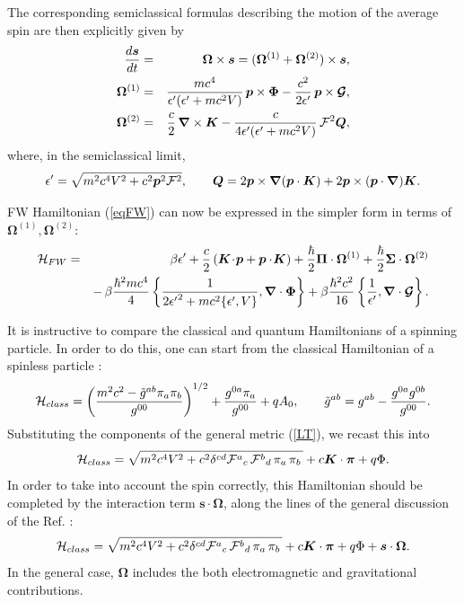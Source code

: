 \documentclass[preprint,showpacs,preprintnumbers,eqsecnum,amsmath,amssymb]{revtex4}
\begin{document}
The corresponding semiclassical formulas describing the motion of
the average spin are then explicitly given by
\begin{eqnarray}
{\frac {d{\bm s}}{dt}} &=& \bm \Omega\times{\bm s}
= (\bm \Omega^{(1)}+\bm \Omega^{(2)})\times{\bm s},\label{ds}\\
\bm\Omega^{(1)} &=& \frac{mc^4}{\epsilon'(\epsilon'+mc^2V)}\,\bm{p}\times\bm\Phi
- \frac{c^2}{2\epsilon'}\,\bm{p}\times\mbox{\boldmath ${\cal G}$},\label{FO}\\
\bm\Omega^{(2)} &=&\frac{c}{2}\,\bm\nabla\times\bm K
-\frac{c}{4\epsilon'(\epsilon'+mc^2V)}\,{\cal F}^2\bm Q,\label{finalOmegase}
\end{eqnarray}
where, in the semiclassical limit,
\begin{equation}
\epsilon'=\sqrt{m^2c^4V^2+c^2\bm p^2{\cal F}^2},\qquad \bm Q =
2\bm p\times\bm\nabla(\bm p\cdot\bm K) +2\bm p\times(\bm
p\cdot\bm\nabla)\bm{K}.\label{eQ}
\end{equation}

FW Hamiltonian (\ref{eqFW}) can now be expressed in the simpler
form in terms of $\bm\Omega^{(1)},\bm\Omega^{(2)}$:
\begin{eqnarray}
{\cal H}_{FW} &=& \beta\epsilon'+\frac c2\left(\bm K\!\cdot\!\bm p
+ \bm p\cdot\!\bm K\right) +\frac\hbar2\bm\Pi\cdot\bm\Omega^{(1)}+
\frac\hbar2\bm\Sigma\cdot\bm\Omega^{(2)}\nonumber\\
&& -\,\beta\frac{\hbar^2mc^4}{4}\left\{\frac{1}{2{\epsilon'}^2 +
mc^2\{\epsilon',V\}},\bm\nabla\cdot\bm\Phi\right\} +
\beta\frac{\hbar^2 c^2}{16}\left\{ \frac{1}{\epsilon'
},\bm\nabla\cdot\mbox{\boldmath ${\cal G}$}\right\}.\label{Hamlt}
\end{eqnarray}

It is instructive to compare the classical and quantum
Hamiltonians of a spinning particle. In order to do this, one can
start from the classical Hamiltonian of a spinless particle
\cite{Cogn}:
\begin{equation}
{\cal H}_{class}=\left(\frac{m^2c^2 - \tilde{g}^{ab}\pi_a\pi_b}{{g}^{00}}
\right)^{1/2} + \frac{g^{0a}\pi_a}{{g}^{00}} + qA_0,\qquad \tilde{g}^{ab}
= g^{ab} - \frac{g^{0a}g^{0b}}{{g}^{00}}.\label{clCog}
\end{equation}
Substituting the components of the general metric (\ref{LT}), we
recast this into
\begin{equation}
{\cal H}_{class}=\sqrt{m^2c^4V^2 + c^2\delta^{cd}{\cal F}^a{}_c\,{\cal F}^b{}_d 
\,\pi_a\,\pi_b\,} + c{\bm K}\cdot{\bm\pi} + q\Phi.\label{clasp0}
\end{equation}
In order to take into account the spin correctly, this Hamiltonian
should be completed by the interaction term $\bm s\cdot\bm\Omega$,
along the lines of the general discussion of the Ref. \cite{PK}:
\begin{equation}
{\cal H}_{class}=\sqrt{m^2c^4V^2 + c^2\delta^{cd}{\cal
F}^a{}_c\,{\cal F}^b{}_d \,\pi_a\,\pi_b\,} + c{\bm K}\cdot{\bm
\pi} + q\Phi+ \bm s\cdot\bm\Omega.\label{clasnewadded}
\end{equation} 
In the general case, $\bm\Omega$ includes the both electromagnetic and 
gravitational contributions.
\end{document}
